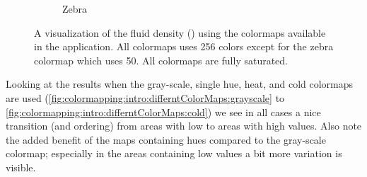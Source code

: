 \begin{figure}[htb]
\begin{subfigure}{0.35\textwidth}
		\caption{Zebra}
		\label{fig:colormapping:intro:differntColorMaps:zebra}
	\end{subfigure}
\caption{A visualization of the fluid density (\density) using the colormaps available in the application. All colormaps uses 256 colors except for the zebra colormap which uses 50. All colormaps are fully saturated.}
\end{figure}


Looking at the results when the gray-scale, single hue, heat, and cold colormaps are used (\cref{fig:colormapping:intro:differntColorMaps:grayscale} to \ref{fig:colormapping:intro:differntColorMaps:cold}) we see in all cases a nice transition (and ordering) from areas with low to areas with high values. Also note the added benefit of the maps containing hues compared to the gray-scale colormap; especially in the areas containing low values a bit more variation is visible.

